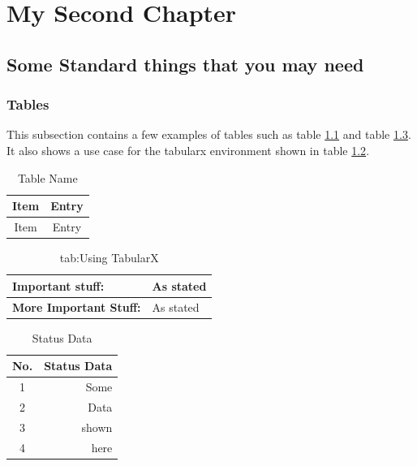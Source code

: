 \chapter{My Second Chapter}
\ifpdf
    \graphicspath{{Chapter2/Chapter2Figs/PNG/}{Chapter2/Chapter2Figs/PDF/}{Chapter2/Chapter2Figs/}}
\else
    \graphicspath{{Chapter2/Chapter2Figs/EPS/}{Chapter2/Chapter2Figs/}}
\fi



\section{Some Standard things that you may need}

\subsection{Tables}

This subsection contains a few examples of tables such as table \ref{tab:TestTable} and table \ref{tab:StatusData}.  It also shows a use case for the tabularx environment shown in table \ref{tab:tabularx}.\\


\begin{table}[ht]
	\centering
	\begin{tabular}{|c|c|}
		\hline
		Item & Entry \\
		\hline
		Item  & Entry \\
		\hline
	\end{tabular}
	\caption{Table Name}
	\label{tab:TestTable}
\end{table}

\begin{table}[ht]
	\begin{tabularx}{\textwidth}{ |X|X| }
		\hline
		\textbf{Important stuff:} & As stated \\
		\hline 
		\textbf{More Important Stuff:}  & As stated  \\
		\hline
	
	\end{tabularx}
	\caption{tab:Using TabularX}
	\label{tab:tabularx}
\end{table}

\begin{table}[ht]
	\centering
	\begin{tabular}{ |c|r| }
		\hline
		\textbf{No.} & \textbf{Status Data} \\
		\hline 
		1 &  Some \\ 
		2 &  Data \\ 
		3 &  shown\\ 
		4 &  here \\
		\hline
	\end{tabular}
	\caption{Status Data}	
	\label{tab:StatusData}
\end{table}


